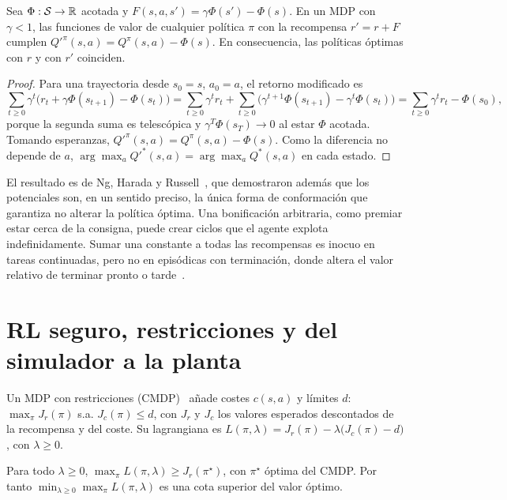 \begin{teorema}\label{teo:shaping}
Sea $\Phi:\mathcal{S}\to\mathbb{R}$ acotada y $F(s,a,s')=\gamma\Phi(s')-\Phi(s)$. En un MDP con $\gamma<1$, las funciones de valor de cualquier política $\pi$ con la recompensa $r'=r+F$ cumplen $Q'^{\pi}(s,a)=Q^{\pi}(s,a)-\Phi(s)$. En consecuencia, las políticas óptimas con $r$ y con $r'$ coinciden.
\end{teorema}

\begin{proof}
Para una trayectoria desde $s_0=s$, $a_0=a$, el retorno modificado es
\[
\sum_{t\ge0}\gamma^{t}\bigl(r_t+\gamma\Phi(s_{t+1})-\Phi(s_t)\bigr)=\sum_{t\ge0}\gamma^{t}r_t+\sum_{t\ge0}\bigl(\gamma^{t+1}\Phi(s_{t+1})-\gamma^{t}\Phi(s_t)\bigr)=\sum_{t\ge0}\gamma^{t}r_t-\Phi(s_0),
\]
porque la segunda suma es telescópica y $\gamma^{T}\Phi(s_T)\to0$ al estar $\Phi$ acotada. Tomando esperanzas, $Q'^{\pi}(s,a)=Q^{\pi}(s,a)-\Phi(s)$. Como la diferencia no depende de $a$, $\arg\max_aQ'^{*}(s,a)=\arg\max_aQ^{*}(s,a)$ en cada estado.
\end{proof}

El resultado es de Ng, Harada y Russell~\cite{ng}, que demostraron además que los potenciales son, en un sentido preciso, la única forma de conformación que garantiza no alterar la política óptima. Una bonificación arbitraria, como premiar estar cerca de la consigna, puede crear ciclos que el agente explota indefinidamente. Sumar una constante a todas las recompensas es inocuo en tareas continuadas, pero no en episódicas con terminación, donde altera el valor relativo de terminar pronto o tarde~\cite[ejercicios~3.15 y~3.16]{sb}.

\section{RL seguro, restricciones y del simulador a la planta}

\begin{definicion}\label{def:cmdp}
Un MDP con restricciones (CMDP)~\cite{altman} añade costes $c(s,a)$ y límites $d$: $\max_\pi J_r(\pi)$ s.a. $J_c(\pi)\le d$, con $J_r$ y $J_c$ los valores esperados descontados de la recompensa y del coste. Su lagrangiana es $L(\pi,\lambda)=J_r(\pi)-\lambda\bigl(J_c(\pi)-d\bigr)$, con $\lambda\ge0$.
\end{definicion}

\begin{proposicion}\label{prop:dual}
Para todo $\lambda\ge0$, $\max_\pi L(\pi,\lambda)\ge J_r(\pi^{\star})$, con $\pi^{\star}$ óptima del CMDP. Por tanto $\min_{\lambda\ge0}\max_\pi L(\pi,\lambda)$ es una cota superior del valor óptimo.
\end{proposicion}

